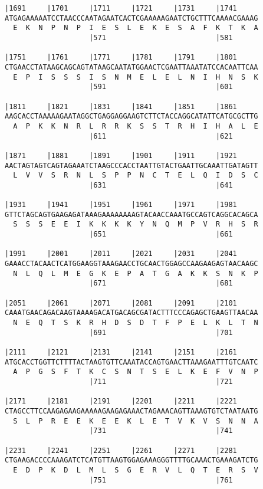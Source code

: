 \documentclass{article}
\begin{document}
\begin{Verbatim}
|1691     |1701     |1711     |1721     |1731     |1741     
ATGAGAAAAATCCTAACCCAATAGAATCACTCGAAAAAGAATCTGCTTTCAAAACGAAAG
  E  K  N  P  N  P  I  E  S  L  E  K  E  S  A  F  K  T  K  A
                    |571                          |581      
  
|1751     |1761     |1771     |1781     |1791     |1801     
CTGAACCTATAAGCAGCAGTATAAGCAATATGGAACTCGAATTAAATATCCACAATTCAA
  E  P  I  S  S  S  I  S  N  M  E  L  E  L  N  I  H  N  S  K
                    |591                          |601      
  
|1811     |1821     |1831     |1841     |1851     |1861     
AAGCACCTAAAAAGAATAGGCTGAGGAGGAAGTCTTCTACCAGGCATATTCATGCGCTTG
  A  P  K  K  N  R  L  R  R  K  S  S  T  R  H  I  H  A  L  E
                    |611                          |621      
  
|1871     |1881     |1891     |1901     |1911     |1921     
AACTAGTAGTCAGTAGAAATCTAAGCCCACCTAATTGTACTGAATTGCAAATTGATAGTT
  L  V  V  S  R  N  L  S  P  P  N  C  T  E  L  Q  I  D  S  C
                    |631                          |641      
  
|1931     |1941     |1951     |1961     |1971     |1981     
GTTCTAGCAGTGAAGAGATAAAGAAAAAAAAGTACAACCAAATGCCAGTCAGGCACAGCA
  S  S  S  E  E  I  K  K  K  K  Y  N  Q  M  P  V  R  H  S  R
                    |651                          |661      
  
|1991     |2001     |2011     |2021     |2031     |2041     
GAAACCTACAACTCATGGAAGGTAAAGAACCTGCAACTGGAGCCAAGAAGAGTAACAAGC
  N  L  Q  L  M  E  G  K  E  P  A  T  G  A  K  K  S  N  K  P
                    |671                          |681      
  
|2051     |2061     |2071     |2081     |2091     |2101     
CAAATGAACAGACAAGTAAAAGACATGACAGCGATACTTTCCCAGAGCTGAAGTTAACAA
  N  E  Q  T  S  K  R  H  D  S  D  T  F  P  E  L  K  L  T  N
                    |691                          |701      
  
|2111     |2121     |2131     |2141     |2151     |2161     
ATGCACCTGGTTCTTTTACTAAGTGTTCAAATACCAGTGAACTTAAAGAATTTGTCAATC
  A  P  G  S  F  T  K  C  S  N  T  S  E  L  K  E  F  V  N  P
                    |711                          |721      
  
|2171     |2181     |2191     |2201     |2211     |2221     
CTAGCCTTCCAAGAGAAGAAAAAGAAGAGAAACTAGAAACAGTTAAAGTGTCTAATAATG
  S  L  P  R  E  E  K  E  E  K  L  E  T  V  K  V  S  N  N  A
                    |731                          |741      
  
|2231     |2241     |2251     |2261     |2271     |2281     
CTGAAGACCCCAAAGATCTCATGTTAAGTGGAGAAAGGGTTTTGCAAACTGAAAGATCTG
  E  D  P  K  D  L  M  L  S  G  E  R  V  L  Q  T  E  R  S  V
                    |751                          |761      
  

\end{Verbatim}
\end{document}
